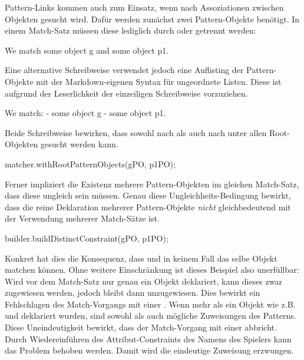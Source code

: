 Pattern-Links kommen auch zum Einsatz, wenn nach Assoziationen zwischen Objekten gesucht wird.
Dafür werden zunächst zwei Pattern-Objekte benötigt.
In einem Match-Satz müssen diese lediglich durch  oder \code{,} getrennt werden:

\begin{mdcodeblock}
    We match some object g and some object p1.
\end{mdcodeblock}

Eine alternative Schreibweise verwendet jedoch eine Auflisting der Pattern-Objekte mit der Markdown-eigenen Syntax für ungeordnete Listen.
Diese ist aufgrund der Leserlichkeit der einzeiligen Schreibweise vorzuziehen.

\begin{mdcodeblock}
    We match:
    - some object g
    - some object p1.
\end{mdcodeblock}

Beide Schreibweise bewirken, dass sowohl nach  als auch nach  unter allen Root-Objekten gesucht werden kann.

\begin{jcodeblock}
    matcher.withRootPatternObjects(gPO, p1PO);
\end{jcodeblock}

Ferner impliziert die Existenz mehrere Pattern-Objekten im gleichen Match-Satz,
dass diese ungleich sein müssen.
Genau diese Ungleichheits-Bedingung bewirkt,
dass die reine Deklaration mehrerer Pattern-Objekte \emph{nicht} gleichbedeutend mit der Verwendung mehrerer Match-Sätze ist.

\begin{jcodeblock}
    builder.buildDistinctConstraint(gPO, p1PO);
\end{jcodeblock}

Konkret hat dies die Konsequenz, dass  und  in keinem Fall das selbe Objekt matchen können.
Ohne weitere Einschränkung ist dieses Beispiel also unerfüllbar:
Wird vor dem Match-Satz nur genau ein Objekt deklariert, kann dieses zwar  zugewiesen werden, jedoch bleibt dann  unzugewiesen.
Dies bewirkt ein Fehlschlagen des Match-Vorgangs mit einer .
Wenn mehr als ein Objekt wie z.B.\  und  deklariert wurden,
sind sowohl  als auch  mögliche Zuweisungen des Patterns.
Diese Uneindeutigkeit bewirkt, dass der Match-Vorgang mit einer  abbricht.
Durch Wiedereinführen des Attribut-Constraints des Namens des Spielers kann das Problem behoben werden.
Damit wird die eindeutige Zuweisung  erzwungen.

